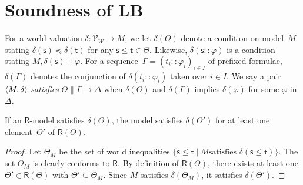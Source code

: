   \section{Soundness of LB}

  For a world valuation $\delta:\mathcal V_W\longrightarrow M$,
  we let $\delta(\Theta)$ denote a condition on
  model~$M$ stating $\delta(\mathsf s)\preceq \delta(\mathsf t)$ for any
  $\mathsf s\le \mathsf t\in\Theta$.
  Likewise, $\delta(\mathsf s::\varphi)$ is a condition stating
  $M,\delta(\mathsf s)\models\varphi$.  For a sequence~$\Gamma =
  (t_i::\varphi_i)_{i\in I}$ of
  prefixed formulae, $\delta(\Gamma)$ denotes the conjunction
  of $\delta(t_i::\varphi_i)$ taken over $i\in I$.
   We say a pair
   $\langle{M,\delta}\rangle$ \textit{satisfies}
   $\Theta\parallel\Gamma\longrightarrow\Delta$ when $\delta(\Theta)$ and
   $\delta(\Gamma)$ implies $\delta(\varphi)$ for some $\varphi$
   in~$\Delta$.

   \begin{proposition}
    \label{exp-sound}
    If an $\mathsf R$-model satisfies $\delta(\Theta)$,
    the model satisfies $\delta(\Theta')$ for
    at least one element~$\Theta'$ of $\mathsf R(\Theta)$.
   \end{proposition}
   \begin{proof}
    Let $\Theta_M$ be the set of world inequalities
    $\{\mathsf s\le \mathsf t\mid M\mbox{
    satisfies }\delta(\mathsf s\le \mathsf t)\}$.
    The set $\Theta_M$ is clearly conforms to $\mathsf R$.
    By definition of $\mathsf R(\Theta)$, there exists at least one $\Theta'\in
    \mathsf R(\Theta)$ with $\Theta'\subseteq \Theta_M$.
    Since $M$ satisfies $\delta(\Theta_M)$, it satisfies $\delta(\Theta')$.
   \end{proof}

